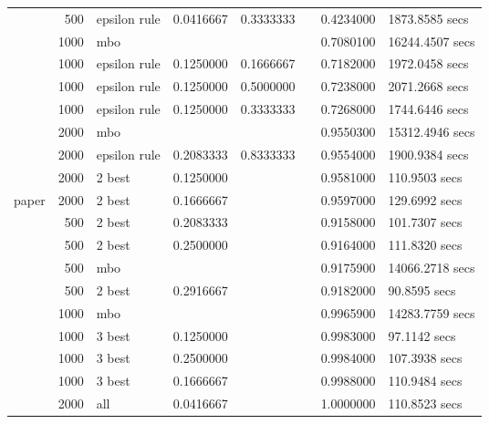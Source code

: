 \begin{longtable}[t]{lrlrrrrl}
 & 500 & epsilon rule & 0.0416667 & 0.3333333 &  & 0.4234000 & 1873.8585 secs\\

 & 1000 & mbo &  &  &  & 0.7080100 & 16244.4507 secs\\

 & 1000 & epsilon rule & 0.1250000 & 0.1666667 &  & 0.7182000 & 1972.0458 secs\\

 & 1000 & epsilon rule & 0.1250000 & 0.5000000 &  & 0.7238000 & 2071.2668 secs\\

 & 1000 & epsilon rule & 0.1250000 & 0.3333333 &  & 0.7268000 & 1744.6446 secs\\

 & 2000 & mbo &  &  &  & 0.9550300 & 15312.4946 secs\\

 & 2000 & epsilon rule & 0.2083333 & 0.8333333 &  & 0.9554000 & 1900.9384 secs\\

 & 2000 & 2 best & 0.1250000 &  &  & 0.9581000 & 110.9503 secs\\

\multirow{-12}{*}{\raggedright\arraybackslash paper} & 2000 & 2 best & 0.1666667 &  &  & 0.9597000 & 129.6992 secs\\
\cmidrule{1-8}
 & 500 & 2 best & 0.2083333 &  &  & 0.9158000 & 101.7307 secs\\

 & 500 & 2 best & 0.2500000 &  &  & 0.9164000 & 111.8320 secs\\

 & 500 & mbo &  &  &  & 0.9175900 & 14066.2718 secs\\

 & 500 & 2 best & 0.2916667 &  &  & 0.9182000 & 90.8595 secs\\

 & 1000 & mbo &  &  &  & 0.9965900 & 14283.7759 secs\\

 & 1000 & 3 best & 0.1250000 &  &  & 0.9983000 & 97.1142 secs\\

 & 1000 & 3 best & 0.2500000 &  &  & 0.9984000 & 107.3938 secs\\

 & 1000 & 3 best & 0.1666667 &  &  & 0.9988000 & 110.9484 secs\\

 & 2000 & all & 0.0416667 &  &  & 1.0000000 & 110.8523 secs\\


\end{longtable}
